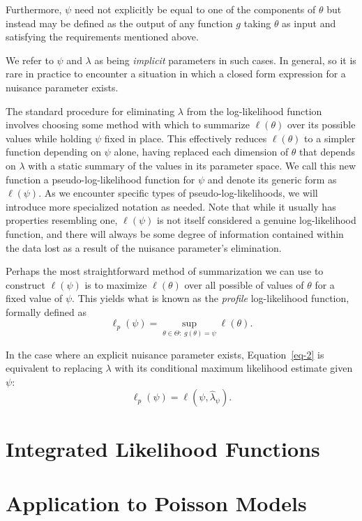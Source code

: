 \documentclass[
  12pt]{article}
\begin{document}
Furthermore, \(\psi\) need not explicitly be equal to one of the
components of \(\theta\) but instead may be defined as the output of any
function \(g\) taking \(\theta\) as input and satisfying the
requirements mentioned above.

We refer to \(\psi\) and \(\lambda\) as being \emph{implicit} parameters
in such cases. In general, so it is rare in practice to encounter a
situation in which a closed form expression for a nuisance parameter
exists.

The standard procedure for eliminating \(\lambda\) from the
log-likelihood function involves choosing some method with which to
summarize \(\ell(\theta)\) over its possible values while holding
\(\psi\) fixed in place. This effectively reduces \(\ell(\theta)\) to a
simpler function depending on \(\psi\) alone, having replaced each
dimension of \(\theta\) that depends on \(\lambda\) with a static
summary of the values in its parameter space. We call this new function
a pseudo-log-likelihood function for \(\psi\) and denote its generic
form as \(\ell(\psi)\). As we encounter specific types of
pseudo-log-likelihoods, we will introduce more specialized notation as
needed. Note that while it usually has properties resembling one,
\(\ell(\psi)\) is not itself considered a genuine log-likelihood
function, and there will always be some degree of information contained
within the data lost as a result of the nuisance parameter's
elimination.

Perhaps the most straightforward method of summarization we can use to
construct \(\ell(\psi)\) is to maximize \(\ell(\theta)\) over all
possible of values of \(\theta\) for a fixed value of \(\psi\). This
yields what is known as the \emph{profile} log-likelihood function,
formally defined as \[
\ell_p(\psi) = \sup_{\theta \in \Theta: \> g(\theta) = \psi} \ell(\theta).
\]

In the case where an explicit nuisance parameter exists,
Equation~\ref{eq-2} is equivalent to replacing \(\lambda\) with its
conditional maximum likelihood estimate given \(\psi\): \[
\ell_p(\psi) = \ell(\psi, \hat{\lambda}_{\psi}).
\]

\section{Integrated Likelihood
Functions}\label{integrated-likelihood-functions}

\section{Application to Poisson
Models}\label{application-to-poisson-models}
\end{document}
